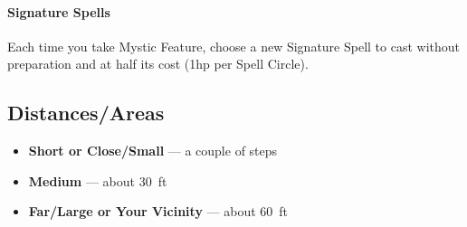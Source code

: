 \documentclass[itdr]{subfiles}
\begin{document}
\paragraph{Signature Spells}
Each time you take Mystic Feature, choose a new Signature Spell to cast without preparation and at half its cost (1hp per Spell Circle).

\vfill
{}

\break

\begin{dbox}
	\subsection*{Distances/Areas}
	\begin{itemize}
		\item \textbf{Short or Close/Small} --- a couple of steps
		\item \textbf{Medium} --- about 30~ft
		\item \textbf{Far/Large or Your Vicinity} --- about 60~ft
	\end{itemize}
\end{dbox}

\vfill
\end{document}
